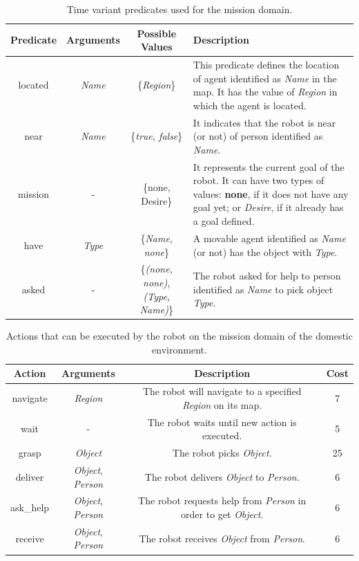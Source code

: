 \begin{table}[H]
    \begin{tabularx}{\textwidth}{ |c|c|c|X| }
     \hline
     Predicate & Arguments &  Possible Values  & Description\\
     \hline
     located    &   \textit{Name}   &   \{\textit{Region}\} & This predicate
     defines the location of agent identified as \textit{Name} in the map. It
     has the value of \textit{Region} in which the agent is located.\\
     near   &   \textit{Name}   &   \{\textit{true, false}\}    &   It indicates
     that the robot is near (or not) of person identified as \textit{Name}.  \\
     mission    &   -  &    \{none, Desire\}  &   It represents the current
     goal of the robot. It can have two types of values: \textbf{none}, if it
     does not have any goal yet; or \textit{Desire}, if it already has a goal
     defined.\\
     have & \textit{Type} & \{\textit{Name, none}\} &  A movable agent
     identified as \textit{Name} (or not) has the object with \textit{Type}. \\
     asked  &   -   &   \{\textit{(none, none), (Type, Name)}\} & The robot
     asked for help to person identified as \textit{Name} to pick object
     \textit{Type}.\\
     \hline
    \end{tabularx}
    \caption{Time variant predicates used for the mission domain.}
    \label{table:dyn_preds_mission}
\end{table}

\begin{table}[H]
    \begin{tabular}{ |c|c|c|c| }
     \hline
     Action & Arguments & Description & Cost\\
     \hline
     navigate   &   \textit{Region}  &   The robot will navigate to a specified
     \textit{Region} on its map. & 7\\
     wait   &   -   &   The robot waits until new action is executed. & 5\\
     grasp  &    \textit{Object}     & The robot picks \textit{Object}. & 25\\
     deliver    &   \textit{Object}, \textit{Person}  & The robot delivers
     \textit{Object} to \textit{Person}. & 6\\
     ask\_help   &   \textit{Object}, \textit{Person}  & The robot requests help
     from \textit{Person} in order to get \textit{Object}. & 6\\
     receive    &   \textit{Object}, \textit{Person}  & The robot receives
     \textit{Object} from \textit{Person}. & 6\\
     \hline
    \end{tabular}
    \caption{Actions that can be executed by the robot on the mission domain of 
    the domestic environment.}
    \label{table:actions_mission}
\end{table}

